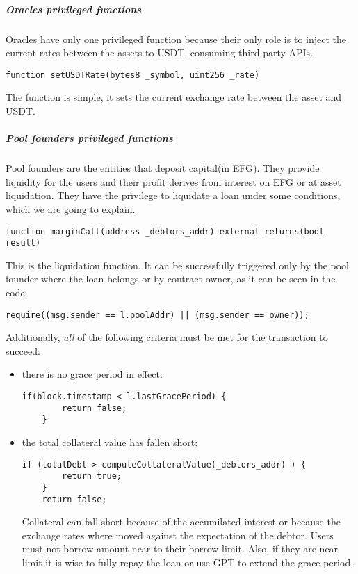 \documentclass{article}
\begin{document}
\subparagraph{Oracles privileged functions}
Oracles have only one privileged function because their only role is to inject the current rates between the assets to USDT, consuming third party APIs.
\begin{lstlisting}[language=Solidity,numbers=none,escapechar=@]
function setUSDTRate(bytes8 _symbol, uint256 _rate)
\end{lstlisting}
The function is simple, it sets the current exchange rate between the asset and USDT. 

\subparagraph{Pool founders privileged functions}
Pool founders are the entities that deposit capital(in EFG). They provide liquidity for the users and their profit derives from interest on EFG or at asset liquidation. They have the privilege to liquidate a loan under some conditions, which we are going to explain.

\begin{lstlisting}[language=Solidity,numbers=none,escapechar=@]
function marginCall(address _debtors_addr) external returns(bool result)
\end{lstlisting}
This is the liquidation function. It can be successfully triggered only by the pool founder where the loan belongs or by contract owner, as it can be seen in the code:
\begin{lstlisting}[language=Solidity,numbers=none,escapechar=@]
require((msg.sender == l.poolAddr) || (msg.sender == owner));
\end{lstlisting}
Additionally, \emph{all} of the following criteria must be met for the transaction to succeed:
\begin{itemize}
\item there is no grace period in effect:
\begin{lstlisting}[language=Solidity,numbers=none,escapechar=@]
if(block.timestamp < l.lastGracePeriod) {
	    return false;
	}
\end{lstlisting}
\item the total collateral value has fallen short:
\begin{lstlisting}[language=Solidity,numbers=none,escapechar=@]
if (totalDebt > computeCollateralValue(_debtors_addr) ) {
	    return true;
	}
	return false;
\end{lstlisting}

Collateral can fall short because of the accumilated interest or because the exchange rates where moved against the expectation of the debtor. Users must not borrow amount near to their borrow limit. Also, if they are near limit it is wise to fully repay the loan or use GPT to extend the grace period.
\end{itemize}
\end{document}
